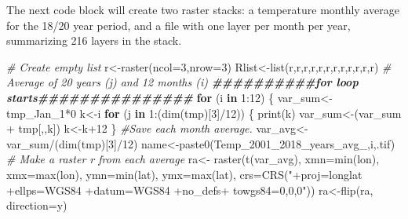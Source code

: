 \documentclass[
  10pt,
  b5paper,
]{book}
\newenvironment{Shaded}{\begin{snugshade}}{\end{snugshade}}
\newcommand{\AttributeTok}[1]{\textcolor[rgb]{0.77,0.63,0.00}{#1}}
\newcommand{\CommentTok}[1]{\textcolor[rgb]{0.56,0.35,0.01}{\textit{#1}}}
\newcommand{\ControlFlowTok}[1]{\textcolor[rgb]{0.13,0.29,0.53}{\textbf{#1}}}
\newcommand{\DecValTok}[1]{\textcolor[rgb]{0.00,0.00,0.81}{#1}}
\newcommand{\DocumentationTok}[1]{\textcolor[rgb]{0.56,0.35,0.01}{\textbf{\textit{#1}}}}
\newcommand{\FunctionTok}[1]{\textcolor[rgb]{0.00,0.00,0.00}{#1}}
\newcommand{\NormalTok}[1]{#1}
\newcommand{\OtherTok}[1]{\textcolor[rgb]{0.56,0.35,0.01}{#1}}
\newcommand{\SpecialCharTok}[1]{\textcolor[rgb]{0.00,0.00,0.00}{#1}}
\newcommand{\StringTok}[1]{\textcolor[rgb]{0.31,0.60,0.02}{#1}}
\begin{document}
The next code block will create two raster stacks: a temperature monthly average for the 18/20 year period, and a file with one layer per month per year, summarizing 216 layers in the stack.

\begin{Shaded}
\begin{Highlighting}[]
\CommentTok{\# Create empty list}
\NormalTok{r}\OtherTok{\textless{}{-}}\FunctionTok{raster}\NormalTok{(}\AttributeTok{ncol=}\DecValTok{3}\NormalTok{,}\AttributeTok{nrow=}\DecValTok{3}\NormalTok{)}
\NormalTok{Rlist}\OtherTok{\textless{}{-}}\FunctionTok{list}\NormalTok{(r,r,r,r,r,r,r,r,r,r,r,r)}
 \CommentTok{\# Average of 20 years (j)  and 12 months (i) }
\DocumentationTok{\#\#\#\#\#\#\#\#\#\#for loop starts\#\#\#\#\#\#\#\#\#\#\#\#\#\#\#}
 \ControlFlowTok{for}\NormalTok{ (i }\ControlFlowTok{in} \DecValTok{1}\SpecialCharTok{:}\DecValTok{12}\NormalTok{) \{ }
\NormalTok{var\_sum}\OtherTok{\textless{}{-}}\NormalTok{tmp\_Jan\_1}\SpecialCharTok{*}\DecValTok{0}
\NormalTok{k}\OtherTok{\textless{}{-}}\NormalTok{i}
\ControlFlowTok{for}\NormalTok{ (j }\ControlFlowTok{in} \DecValTok{1}\SpecialCharTok{:}\NormalTok{(}\FunctionTok{dim}\NormalTok{(tmp)[}\DecValTok{3}\NormalTok{]}\SpecialCharTok{/}\DecValTok{12}\NormalTok{)) \{}
\FunctionTok{print}\NormalTok{(k)}
\NormalTok{var\_sum}\OtherTok{\textless{}{-}}\NormalTok{(var\_sum }\SpecialCharTok{+}\NormalTok{ tmp[,,k])}
\NormalTok{ k}\OtherTok{\textless{}{-}}\NormalTok{k}\SpecialCharTok{+}\DecValTok{12}
\NormalTok{ \}}
\CommentTok{\#Save each month average. }
\NormalTok{ var\_avg}\OtherTok{\textless{}{-}}\NormalTok{var\_sum}\SpecialCharTok{/}\NormalTok{(}\FunctionTok{dim}\NormalTok{(tmp)[}\DecValTok{3}\NormalTok{]}\SpecialCharTok{/}\DecValTok{12}\NormalTok{)}
\NormalTok{name}\OtherTok{\textless{}{-}}\FunctionTok{paste0}\NormalTok{(}\StringTok{\textquotesingle{}Temp\_2001\_2018\_years\_avg\_\textquotesingle{}}\NormalTok{,i,}\StringTok{\textquotesingle{}.tif\textquotesingle{}}\NormalTok{)}
 \CommentTok{\# Make a raster r from each average}
\NormalTok{ra}\OtherTok{\textless{}{-}} \FunctionTok{raster}\NormalTok{(}\FunctionTok{t}\NormalTok{(var\_avg), }\AttributeTok{xmn=}\FunctionTok{min}\NormalTok{(lon), }\AttributeTok{xmx=}\FunctionTok{max}\NormalTok{(lon), }\AttributeTok{ymn=}\FunctionTok{min}\NormalTok{(lat), }\AttributeTok{ymx=}\FunctionTok{max}\NormalTok{(lat), }\AttributeTok{crs=}\FunctionTok{CRS}\NormalTok{(}\StringTok{"+proj=longlat +ellps=WGS84 +datum=WGS84 +no\_defs+ towgs84=0,0,0"}\NormalTok{))}
\NormalTok{ra}\OtherTok{\textless{}{-}}\FunctionTok{flip}\NormalTok{(ra, }\AttributeTok{direction=}\StringTok{\textquotesingle{}y\textquotesingle{}}\NormalTok{)}

\end{Highlighting}
\end{Shaded}
\end{document}

